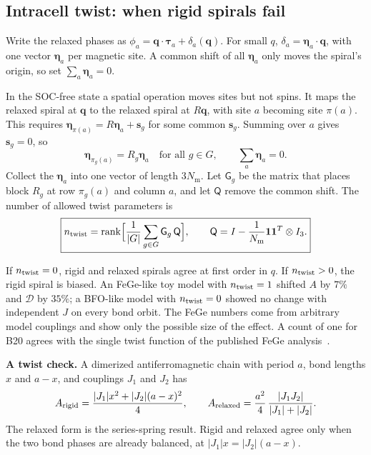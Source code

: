 \documentclass[11pt,a4paper]{article}
\numberwithin{equation}{section}
\newcommand{\vct}[1]{\bm{#1}}
\newcommand{\qh}{\vct q}
\newcommand{\Nm}{N_{\mathrm m}}
\newcommand{\Dt}{\mathcal D}
\begin{document}
\subsection{Intracell twist: when rigid spirals fail}\label{sec:twist}

Write the relaxed phases as $\phi_a=\qh\cdot\vct\tau_a+\delta_a(\qh)$. For small
$q$, $\delta_a=\vct\eta_a\cdot\qh$, with one vector $\vct\eta_a$ per magnetic
site. A common shift of all $\vct\eta_a$ only moves the spiral's origin, so set
$\sum_a\vct\eta_a=0$.

In the SOC-free state a spatial operation moves sites but not spins. It maps the
relaxed spiral at $\qh$ to the relaxed spiral at $R\qh$, with site $a$ becoming
site $\pi(a)$. This requires $\vct\eta_{\pi(a)}=R\vct\eta_a+\vct s_g$ for some
common $\vct s_g$. Summing over $a$ gives $\vct s_g=0$, so
\begin{equation}\label{eq:twist}
 \vct\eta_{\pi_g(a)}=R_g\vct\eta_a\quad\text{for all }g\in G,\qquad
 \sum_a\vct\eta_a=0.
\end{equation}
Collect the $\vct\eta_a$ into one vector of length $3\Nm$. Let $\mathsf G_g$ be
the matrix that places block $R_g$ at row $\pi_g(a)$ and column $a$, and let
$\mathsf Q$ remove the common shift. The number of allowed twist parameters is
\begin{equation}\label{eq:ntwist}
 \boxed{n_{\rm twist}=\operatorname{rank}\Bigl[
 \frac{1}{|G|}\sum_{g\in G}\mathsf G_g\,\mathsf Q\Bigr],
 \qquad
 \mathsf Q=I-\frac{1}{\Nm}\vct 1\vct 1^{T}\otimes I_3.}
\end{equation}

If $n_{\rm twist}=0$, rigid and relaxed spirals agree at first order in $q$. If
$n_{\rm twist}>0$, the rigid spiral is biased. An FeGe-like toy model with
$n_{\rm twist}=1$ shifted $A$ by $7\%$ and $\Dt$ by $35\%$; a BFO-like model with
$n_{\rm twist}=0$ showed no change with independent $J$ on every bond orbit. The
FeGe numbers come from arbitrary model couplings and show only the possible size
of the effect. A count of one for B20 agrees with the single twist function of
the published FeGe analysis~\cite{twisted}.

\textbf{A twist check.} A dimerized antiferromagnetic chain with period $a$,
bond lengths $x$ and $a-x$, and couplings $J_1$ and $J_2$ has
\begin{equation}\label{eq:chain}
 A_{\rm rigid}=\frac{|J_1|x^2+|J_2|(a-x)^2}{4},
 \qquad
 A_{\rm relaxed}=\frac{a^2}{4}\,\frac{|J_1J_2|}{|J_1|+|J_2|}.
\end{equation}
The relaxed form is the series-spring result. Rigid and relaxed agree only when
the two bond phases are already balanced, at $|J_1|x=|J_2|(a-x)$.
\end{document}
